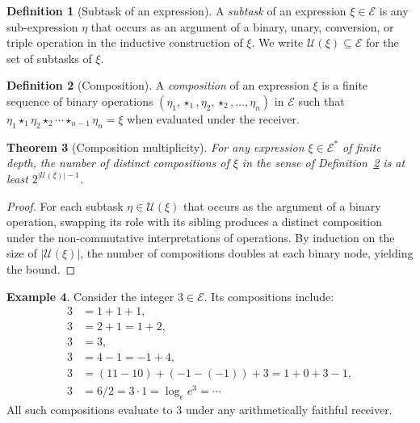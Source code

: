\documentclass[twocolumn,11pt,a4paper]{article}
\theoremstyle{thmstyle}
\newtheorem{theorem}{Theorem}[section]
\theoremstyle{thmstyle}
\theoremstyle{definition}
\newtheorem{definition}[theorem]{Definition}
\newtheorem{example}[theorem]{Example}
\theoremstyle{remark}
\newcommand{\Expr}{\mathcal{E}}
\newcommand{\Sub}{\mathcal{U}}
\begin{document}
\begin{definition}[Subtask of an expression]\label{def:subtask}
A \emph{subtask} of an expression $\xi \in \Expr$ is any
sub-expression $\eta$ that occurs as an argument of a
binary, unary, conversion, or triple operation in the
inductive construction of $\xi$.  We write
$\Sub(\xi) \subseteq \Expr$ for the set of subtasks of
$\xi$.
\end{definition}

\begin{definition}[Composition]\label{def:composition}
A \emph{composition} of an expression $\xi$ is a finite
sequence of binary operations
$(\eta_{1}, \star_{1}, \eta_{2}, \star_{2}, \ldots,
 \eta_{n})$ in $\Expr$ such that
$\eta_{1} \star_{1} \eta_{2} \star_{2} \cdots \star_{n-1}
\eta_{n} = \xi$ when evaluated under the receiver.
\end{definition}

\begin{theorem}[Composition multiplicity]\label{thm:comp-mult}
For any expression $\xi \in \Expr^{*}$ of finite depth,
the number of distinct compositions of $\xi$ in the
sense of Definition~\ref{def:composition} is at least
$2^{|\Sub(\xi)|-1}$.
\end{theorem}

\begin{proof}
For each subtask $\eta \in \Sub(\xi)$ that occurs as the
argument of a binary operation, swapping its role with
its sibling produces a distinct composition under the
non-commutative interpretations of operations.  By
induction on the size of $|\Sub(\xi)|$, the number of
compositions doubles at each binary node, yielding the
bound.
\end{proof}

\begin{example}\label{ex:integer-3}
Consider the integer $3 \in \Expr$.  Its compositions
include:
\begin{align*}
3 &= 1 + 1 + 1, \\
3 &= 2 + 1 = 1 + 2, \\
3 &= 3, \\
3 &= 4 - 1 = -1 + 4, \\
3 &= (11 - 10) + (-1 - (-1)) + 3 = 1 + 0 + 3 - 1, \\
3 &= 6/2 = 3 \cdot 1 = \log_{e} e^{3} = \cdots
\end{align*}
All such compositions evaluate to $3$ under any
arithmetically faithful receiver.
\end{example}
\end{document}
